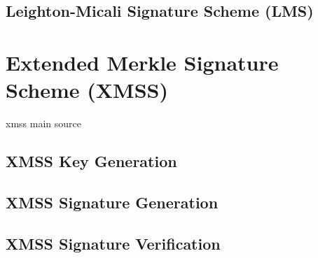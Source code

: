 \subsection{Leighton-Micali Signature Scheme (LMS)}



\section{Extended Merkle Signature Scheme (XMSS)}
xmss main source~\cite{xmss_RFC8391}



\subsection{XMSS Key Generation}

\subsection{XMSS Signature Generation}

\subsection{XMSS Signature Verification}




